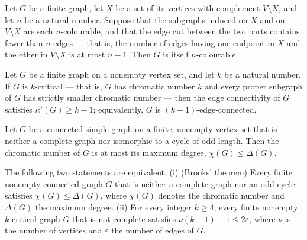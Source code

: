 \begin{theorem}
\label{SimpleGraph.kainen}
\leanok
Let $G$ be a finite graph, let $X$ be a set of its vertices with complement $V \setminus
X$, and let $n$ be a natural number. Suppose that the subgraphs induced on $X$ and on $V
\setminus X$ are each $n$-colourable, and that the edge cut between the two parts
contains fewer than $n$ edges — that is, the number of edges having one endpoint in $X$
and the other in $V \setminus X$ is at most $n-1$. Then $G$ is itself $n$-colourable.
\end{theorem}

\begin{theorem}
\label{SimpleGraph.IsKCritical.edgeConnectivity_ge}
\leanok
{}
Let $G$ be a finite graph on a nonempty vertex set, and let $k$ be a natural number. If
$G$ is $k$-critical — that is, $G$ has chromatic number $k$ and every proper subgraph of
$G$ has strictly smaller chromatic number — then the edge connectivity of $G$ satisfies
$\kappa'(G) \ge k - 1$; equivalently, $G$ is $(k-1)$-edge-connected.
\end{theorem}

\begin{theorem}
\label{SimpleGraph.brooks_chromaticNumber_le_maxDegree}
\leanok
Let $G$ be a connected simple graph on a finite, nonempty vertex set that is neither a
complete graph nor isomorphic to a cycle of odd length. Then the chromatic number of $G$
is at most its maximum degree, $\chi(G) \le \Delta(G)$.
\end{theorem}

\begin{theorem}
\label{SimpleGraph.brooks_iff_edge_bound}
\leanok
{}
The following two statements are equivalent. (i) (Brooks' theorem) Every finite nonempty
connected graph $G$ that is neither a complete graph nor an odd cycle satisfies $\chi(G)
\le \Delta(G)$, where $\chi(G)$ denotes the chromatic number and $\Delta(G)$ the maximum
degree. (ii) For every integer $k \ge 4$, every finite nonempty $k$-critical graph $G$
that is not complete satisfies $\nu(k-1) + 1 \le 2\varepsilon$, where $\nu$ is the
number of vertices and $\varepsilon$ the number of edges of $G$.
\end{theorem}

